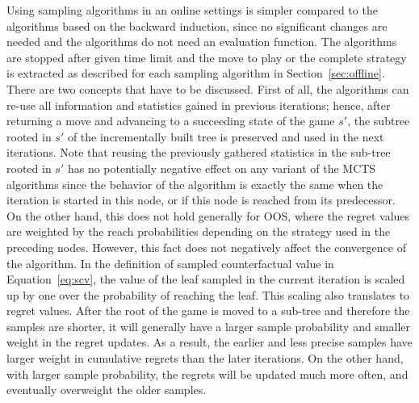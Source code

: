 Using sampling algorithms in an online settings is simpler compared to the algorithms based on the backward induction, since no significant changes are needed and the algorithms do not need an evaluation function.
The algorithms are stopped after given time limit and the move to play or the complete strategy is extracted as described for each sampling algorithm in Section~\ref{sec:offline}.
There are two concepts that have to be discussed. 
First of all, the algorithms can re-use all information and statistics gained in previous iterations; hence, after returning a move and advancing to a succeeding state of the game $s'$, the subtree rooted in $s'$ of the incrementally built tree is preserved and used in the next iterations. 
Note that reusing the previously gathered statistics in the sub-tree rooted in $s'$ has no potentially negative effect on any variant of the MCTS algorithms since the behavior of the algorithm is exactly the same when the iteration is started in this node, or if this node is reached from its predecessor. On the other hand, this does not hold generally for OOS, where the regret values are weighted by the reach probabilities depending on the strategy used in the preceding nodes.  However, this fact does not negatively affect the convergence of the algorithm. In the definition of sampled counterfactual value in Equation~\ref{eq:scv}, the value of the leaf sampled in the current iteration is scaled up by one over the probability of reaching the leaf. This scaling also translates to regret values. After the root of the game is moved to a sub-tree and therefore the samples are shorter, it will generally have a larger sample probability and smaller weight in the regret updates. As a result, the earlier and less precise samples have larger weight in cumulative regrets than the later iterations. On the other hand, with larger sample probability, the regrets will be updated much more often, and eventually overweight the older samples.

